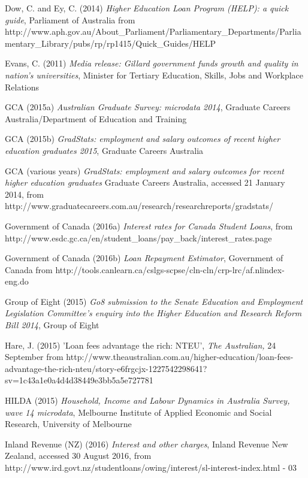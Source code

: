 \documentclass[]{book}
\begin{document}
\protect\hypertarget{_ENREF_39}{}{}Dow, C. and Ey, C. (2014) \emph{Higher Education Loan Program (HELP): a quick guide}, Parliament of Australia from http://www.aph.gov.au/About\_Parliament/Parliamentary\_Departments/Parliamentary\_Library/pubs/rp/rp1415/Quick\_Guides/HELP

\protect\hypertarget{_ENREF_40}{}{}Evans, C. (2011) \emph{Media release: Gillard government funds growth and quality in nation's universities}, Minister for Tertiary Education, Skills, Jobs and Workplace Relations

\protect\hypertarget{_ENREF_41}{}{}GCA (2015a) \emph{Australian Graduate Survey: microdata 2014}, Graduate Careers Australia/Department of Education and Training

\protect\hypertarget{_ENREF_42}{}{}GCA (2015b) \emph{GradStats: employment and salary outcomes of recent higher education graduates 2015}, Graduate Careers Australia

\protect\hypertarget{_ENREF_43}{}{}GCA (various years) \emph{GradStats: employment and salary outcomes for recent higher education graduates} Graduate Careers Australia, accessed 21 January 2014, from http://www.graduatecareers.com.au/research/researchreports/gradstats/

\protect\hypertarget{_ENREF_44}{}{}Government of Canada (2016a) \emph{Interest rates for Canada Student Loans}, from http://www.esdc.gc.ca/en/student\_loans/pay\_back/interest\_rates.page

\protect\hypertarget{_ENREF_45}{}{}Government of Canada (2016b) \emph{Loan Repayment Estimator}, Government of Canada from http://tools.canlearn.ca/cslgs-scpse/cln-cln/crp-lrc/af.nlindex-eng.do

\protect\hypertarget{_ENREF_46}{}{}Group of Eight (2015) \emph{Go8 submission to the Senate Education and Employment Legislation Committee's enquiry into the Higher Education and Research Reform Bill 2014}, Group of Eight

\protect\hypertarget{_ENREF_47}{}{}Hare, J. (2015) 'Loan fees advantage the rich: NTEU', \emph{The Australian,} 24 September from http://www.theaustralian.com.au/higher-education/loan-fees-advantage-the-rich-nteu/story-e6frgcjx-1227542298641?sv=1c43a1e0a4d4d38449e3bb5a5e727781

\protect\hypertarget{_ENREF_48}{}{}HILDA (2015) \emph{Household, Income and Labour Dynamics in Australia Survey, wave 14 microdata}, Melbourne Institute of Applied Economic and Social Research, University of Melbourne

\protect\hypertarget{_ENREF_49}{}{}Inland Revenue (NZ) (2016) \emph{Interest and other charges}, Inland Revenue New Zealand, accessed 30 August 2016, from http://www.ird.govt.nz/studentloans/owing/interest/sl-interest-index.html - 03
\end{document}
